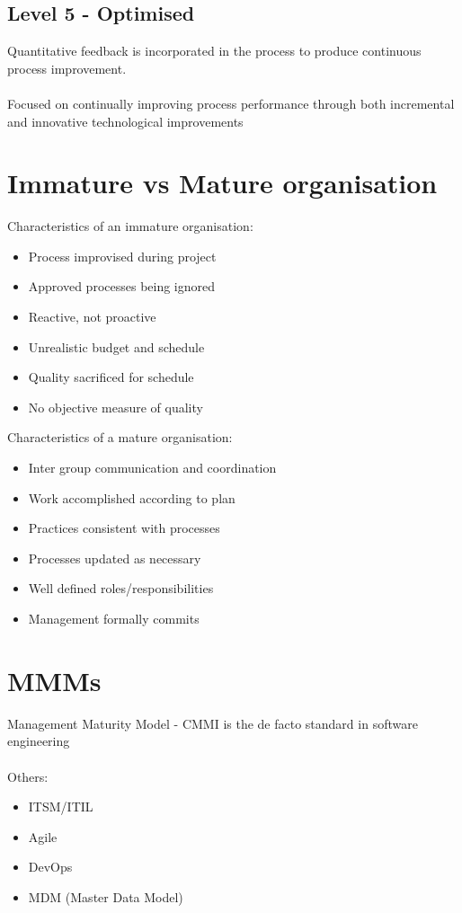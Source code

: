 \documentclass{article}[18pt]
\begin{document}
\subsection{Level 5 - Optimised}
Quantitative feedback is incorporated in the process to produce continuous process improvement.\\
\\
Focused on continually improving process performance through both incremental and innovative technological improvements
\section{Immature vs Mature organisation}
Characteristics of an immature organisation:
\begin{itemize}
	\item Process improvised during project
	\item Approved processes being ignored
	\item Reactive, not proactive
	\item Unrealistic budget and schedule
	\item Quality sacrificed for schedule
	\item No objective measure of quality
\end{itemize}
Characteristics of a mature organisation:
\begin{itemize}
	\item Inter group communication and coordination
	\item Work accomplished according to plan
	\item Practices consistent with processes
	\item Processes updated as necessary
	\item Well defined roles/responsibilities
	\item Management formally commits
\end{itemize}
\section{MMMs}
Management Maturity Model - CMMI is the de facto standard in software engineering\\
\\
Others:
\begin{itemize}
	\item ITSM/ITIL
	\item Agile
	\item DevOps
	\item MDM (Master Data Model)
\end{itemize}
\end{document}
